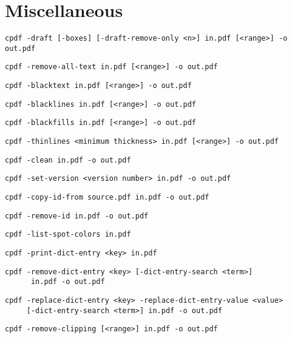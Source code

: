 \documentclass{book}
\begin{document}
\clearpage\pagestyle{empty}
\chapter{Miscellaneous}\label{chap:misc}\pagestyle{fancy}
  {\small\begin{framed}
  \noindent\verb!cpdf -draft [-boxes] [-draft-remove-only <n>] in.pdf [<range>] -o out.pdf!

  \vspace{1.5mm}
  \noindent\verb!cpdf -remove-all-text in.pdf [<range>] -o out.pdf!

  \vspace{1.5mm}
  \noindent\verb!cpdf -blacktext in.pdf [<range>] -o out.pdf!

  \vspace{1.5mm}
  \noindent\verb!cpdf -blacklines in.pdf [<range>] -o out.pdf!

  \vspace{1.5mm}
  \noindent\verb!cpdf -blackfills in.pdf [<range>] -o out.pdf!

  \vspace{1.5mm}
  \noindent\verb!cpdf -thinlines <minimum thickness> in.pdf [<range>] -o out.pdf!

  \vspace{1.5mm}
  \noindent\verb!cpdf -clean in.pdf -o out.pdf!

  \vspace{1.5mm}
  \noindent\verb!cpdf -set-version <version number> in.pdf -o out.pdf!

  \vspace{1.5mm}
  \noindent\verb!cpdf -copy-id-from source.pdf in.pdf -o out.pdf!

  \vspace{1.5mm}
  \noindent\verb!cpdf -remove-id in.pdf -o out.pdf!

  \vspace{1.5mm}
  \noindent\verb!cpdf -list-spot-colors in.pdf!

  \vspace{1.5mm}
  \noindent\verb!cpdf -print-dict-entry <key> in.pdf!

  \vspace{1.5mm}
  \noindent\verb!cpdf -remove-dict-entry <key> [-dict-entry-search <term>]!\\
  \noindent\verb!      in.pdf -o out.pdf!

  \vspace{1.5mm}
  \noindent\verb!cpdf -replace-dict-entry <key> -replace-dict-entry-value <value>!\\
  \noindent\verb!     [-dict-entry-search <term>] in.pdf -o out.pdf!

  \vspace{1.5mm}
  \noindent\verb!cpdf -remove-clipping [<range>] in.pdf -o out.pdf!
  \end{framed}}
\end{document}
